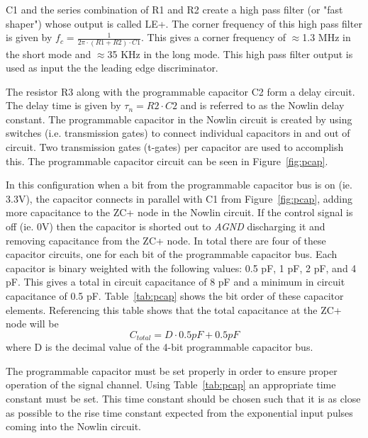 \documentclass[12pt,oneside,final]{siuethesis}
\theoremstyle{definition}
\begin{document}
\par C1 and the series combination of R1 and R2 create a high pass filter (or "fast shaper") whose output is called LE+. The corner frequency of this high pass filter is given by $f_{c} = \frac{1}{2\pi \cdot(R1 + R2)\cdot C1}$. This gives a corner frequency of $\approx$1.3 MHz in the short mode and $\approx$35 KHz in the long mode. This high pass filter output is used as input the the leading edge discriminator. 
\par The resistor R3 along with the programmable capacitor C2 form a delay circuit. The delay time is given by $\tau_{n} = R2 \cdot C2$ and is referred to as the Nowlin delay constant. The programmable capacitor in the Nowlin circuit is created by using switches (i.e. transmission gates) to connect individual capacitors in and out of circuit. Two transmission gates (t-gates) per capacitor are used to accomplish this. The programmable capacitor circuit can be seen in Figure~\ref{fig:pcap}.
\par In this configuration when a bit from the programmable capacitor bus is on (ie. 3.3V), the capacitor connects in parallel with C1 from Figure~\ref{fig:pcap}, adding more capacitance to the ZC+ node in the Nowlin circuit. If the control signal is off (ie. 0V) then the capacitor is shorted out to \emph{AGND} discharging it and removing capacitance from the ZC+ node. In total there are four of these capacitor circuits, one for each bit of the programmable capacitor bus. Each capacitor is binary weighted with the following values: 0.5 pF, 1 pF, 2 pF, and 4 pF. This gives a total in circuit capacitance of 8 pF and a minimum in circuit capacitance of 0.5 pF. Table~\ref{tab:pcap} shows the bit order of these capacitor elements. Referencing this table shows that the total capacitance at the ZC+ node will be \begin{equation}
C_{total} = D \cdot 0.5 pF + 0.5 pF
\end{equation} 
where D is the decimal value of the 4-bit programmable capacitor bus.
\par The programmable capacitor must be set properly in order to ensure proper operation of the signal channel. Using Table~\ref{tab:pcap} an appropriate time constant must be set. This time constant should be chosen such that it is as close as possible to the rise time constant expected from the exponential input pulses coming into the Nowlin circuit.
\end{document}
